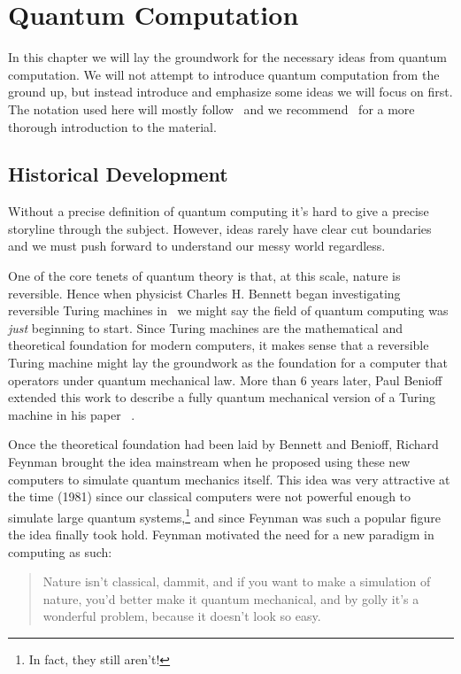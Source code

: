 \chapter{Quantum Computation}\label{ch:computation}

In this chapter we will lay the groundwork for the necessary ideas from quantum computation.
We will not attempt to introduce quantum computation from the ground up, but instead introduce and emphasize some ideas we will focus on first.
The notation used here will mostly follow~\cite{watroustqi} and we recommend~\cite{nielsenchuang} for a more thorough introduction to the material.

\section{Historical Development}\label{sec:history}
Without a precise definition of quantum computing it's hard to give a precise storyline through the subject.
However, ideas rarely have clear cut boundaries and we must push forward to understand our messy world regardless.

One of the core tenets of quantum theory is that, at this scale, nature is reversible.
Hence when physicist Charles H. Bennett began investigating reversible Turing machines in~\cite{reversibleturing} we might say the field of quantum computing was \emph{just} beginning to start.
Since Turing machines are the mathematical and theoretical foundation for modern computers, it makes sense that a reversible Turing machine might lay the groundwork as the foundation for a computer that operators under quantum mechanical law.
More than 6 years later, Paul Benioff extended this work to describe a fully quantum mechanical version of a Turing machine in his paper ~\cite{quantumturing}.

Once the theoretical foundation had been laid by Bennett and Benioff, Richard Feynman brought the idea mainstream when he proposed using these new computers to simulate quantum mechanics itself.
This idea was very attractive at the time (1981) since our classical computers were not powerful enough to simulate large quantum systems,\footnote{In fact, they still aren't!} and since Feynman was such a popular figure the idea finally took hold.
Feynman motivated the need for a new paradigm in computing as such:
\begin{quote}
    Nature isn't classical, dammit, and if you want to make a simulation of nature, you'd better make it quantum mechanical, and by golly it's a wonderful problem, because it doesn't look so easy.
\end{quote}

